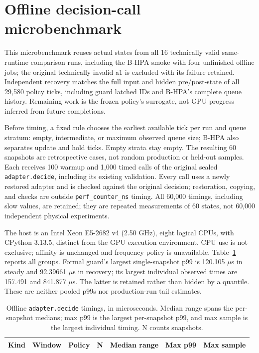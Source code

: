 \section{Offline decision-call microbenchmark}
This microbenchmark reuses actual states from all 16 technically valid same-runtime comparison runs, including the
B-HPA smoke with four unfinished offline jobs; the original technically invalid
a1 is excluded with its failure retained. Independent recovery matches the full
input and hidden pre/post-state of all 29,580 policy ticks, including guard
latched IDs and B-HPA's complete queue history. Remaining work is the frozen
policy's surrogate, not GPU progress inferred from future completions.

Before timing, a fixed rule chooses the earliest available tick per run and
queue stratum: empty, intermediate, or maximum observed queue size; B-HPA also
separates update and hold ticks. Empty strata stay empty. The resulting 60
snapshots are retrospective cases, not random production or held-out samples.
Each receives 100 warmup and 1,000 timed calls of the original sealed
\texttt{adapter.decide}, including its existing validation. Every call uses a
newly restored adapter and is checked against the original decision; restoration,
copying, and checks are outside \texttt{perf\_counter\_ns} timing. All 60,000
timings, including slow values, are retained; they are repeated measurements of
60 states, not 60,000 independent physical experiments.

The host is an Intel Xeon E5-2682 v4 (2.50 GHz), eight logical CPUs, with CPython
3.13.5, distinct from the GPU execution environment. CPU use is not exclusive;
affinity is unchanged and frequency policy is unavailable. Table~\ref{tab:decidecall}
reports all groups. Formal guard's largest single-snapshot p99 is 120.105
$\mu$s in steady and 92.39661 $\mu$s in recovery; its largest individual observed
times are 157.491 and 841.877 $\mu$s. The latter is retained rather than hidden
by a quantile. These are neither pooled p99s nor production-run tail estimates.

\begin{table}[t]
\centering
\small
\caption{Offline \texttt{adapter.decide} timings, in microseconds.
Median range spans the per-snapshot medians; max p99 is the largest per-snapshot
p99, and max sample is the largest individual timing. N counts snapshots.}
\label{tab:decidecall}
\setlength{\tabcolsep}{3pt}
\par\vspace{4pt}
\begin{tabular*}{0.92\linewidth}{@{\extracolsep{\fill}}lllrrrr@{}}
\toprule
Kind & Window & Policy & N & Median range & Max p99 & Max sample\\
\midrule

\end{tabular*}
\end{table}

